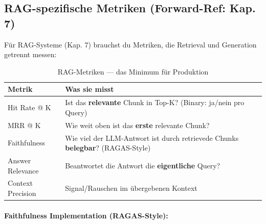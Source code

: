 \subsection{RAG-spezifische Metriken (Forward-Ref: Kap. 7)}

Für RAG-Systeme (Kap. 7) brauchst du Metriken, die Retrieval und Generation getrennt messen:

\begin{table}[H]
\centering
\begin{tabularx}{\linewidth}{lX}
\toprule
\textbf{Metrik} & \textbf{Was sie misst} \\
\midrule
Hit Rate @ K & Ist das \textbf{relevante} Chunk in Top-K? (Binary: ja/nein pro Query) \\
MRR @ K & Wie weit oben ist das \textbf{erste} relevante Chunk? \\
Faithfulness & Wie viel der LLM-Antwort ist durch retrievede Chunks \textbf{belegbar}? (RAGAS-Style) \\
Answer Relevance & Beantwortet die Antwort die \textbf{eigentliche} Query? \\
Context Precision & Signal/Rauschen im übergebenen Kontext \\
\bottomrule
\end{tabularx}
\caption{RAG-Metriken — das Minimum für Produktion}
\end{table}

\paragraph{Faithfulness Implementation (RAGAS-Style):}

